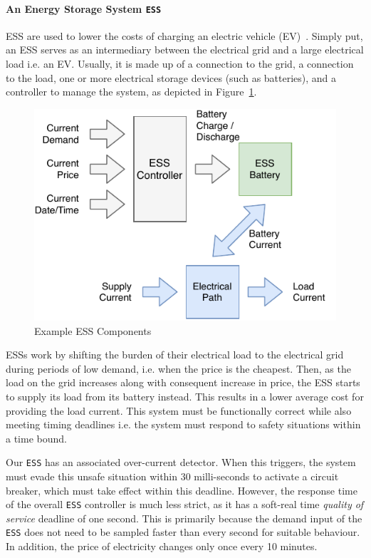 \paragraph{An Energy Storage System \texttt{ESS}}
\label{sec:ess}
\acf{ESS} are used to lower the costs of
charging an electric vehicle (EV)~\cite{chaudhari2017hybrid}. %
Simply put, an \ac{ESS} serves as an intermediary between the electrical grid and a large electrical load i.e. an EV.
Usually, it is made up of a connection to the grid, a connection to
the load, one or more electrical storage devices (such as batteries), and a controller to manage the system, as 
depicted in Figure~\ref{fig:ess-components}.

\begin{figure}[H]
	\vspace{-3mm}
	\centering
	\includegraphics[scale=0.68]{Content/fig/ess_components}
	\caption{Example \ac{ESS} Components\label{fig:ess-components}}
\end{figure}

\acp{ESS} work by shifting the burden of their electrical load to the
electrical grid during periods of low demand, i.e. when the price is the cheapest.
Then, as the load on the grid increases along with consequent increase
in price, the \ac{ESS} starts to supply its load from its battery instead. 
This results in a lower average cost for providing the load current. 
This system must be functionally correct while also meeting timing
deadlines i.e.
the system must respond to safety situations within a time bound. 

Our \texttt{ESS} has an associated
over-current detector.  When this triggers, the system must evade this
unsafe situation within 30 milli-seconds to activate a circuit
breaker, which must take effect within this deadline. 
However, the response time of the overall \texttt{ESS} controller is much less strict, as it has a soft-real time \textit{quality of service} deadline of one second.
This is primarily because the demand input of the \texttt{ESS} does not need to be sampled faster than every second for suitable behaviour.
In addition, the price of electricity changes only once every 10 minutes.

